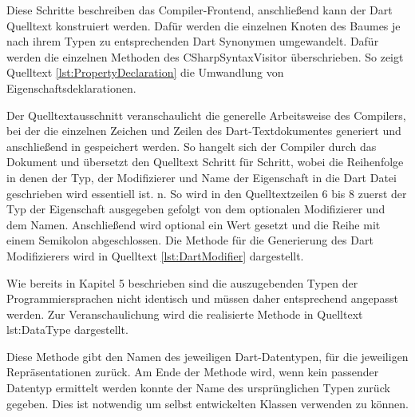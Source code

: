 Diese Schritte beschreiben das Compiler-Frontend,  anschließend kann der Dart Quelltext konstruiert werden.  Dafür werden die einzelnen Knoten des Baumes je nach ihrem Typen zu entsprechenden Dart Synonymen umgewandelt.  Dafür werden die einzelnen Methoden des \glq CSharpSyntaxVisitor\grq{} überschrieben.  So zeigt Quelltext \ref{lst:PropertyDeclaration} die Umwandlung von Eigenschaftsdeklarationen.
\newpage


Der Quelltextausschnitt veranschaulicht die generelle Arbeitsweise des Compilers,  bei der die einzelnen Zeichen und Zeilen des Dart-Textdokumentes generiert und anschließend in gespeichert werden.  So hangelt sich der Compiler durch das Dokument und übersetzt den Quelltext Schritt für Schritt, wobei die Reihenfolge in denen der 
Typ, der Modifizierer und Name der Eigenschaft in die Dart Datei geschrieben wird essentiell ist.
n.  So wird in den Quelltextzeilen 6 bis 8 zuerst der Typ der Eigenschaft ausgegeben gefolgt von dem optionalen Modifizierer und dem Namen.   Anschließend wird optional ein Wert gesetzt und die Reihe mit einem Semikolon abgeschlossen.  Die Methode für die Generierung des Dart Modifizierers wird in Quelltext \ref{lst:DartModifier} dargestellt.




Wie bereits in Kapitel 5 beschrieben sind die auszugebenden Typen der Programmiersprachen nicht identisch und müssen daher entsprechend angepasst werden.  Zur  Veranschaulichung wird die realisierte Methode in Quelltext {lst:DataType} dargestellt. 


Diese Methode gibt den Namen des jeweiligen Dart-Datentypen,  für die jeweiligen \Csharp Repräsentationen zurück.  Am Ende der Methode wird,  wenn kein passender Datentyp ermittelt werden konnte der Name des ursprünglichen Typen zurück gegeben.  Dies ist notwendig um selbst entwickelten Klassen verwenden zu können. 


